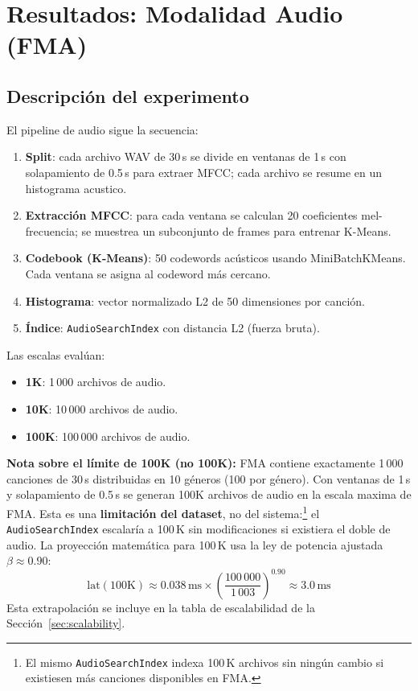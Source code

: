 \documentclass[12pt,a4paper]{article}
\newcommand{\system}[1]{\texttt{\small #1}}
\begin{document}
\section{Resultados: Modalidad Audio (FMA)}

\subsection{Descripción del experimento}

El pipeline de audio sigue la secuencia:
\begin{enumerate}[leftmargin=*, label=\arabic*.]
  \item \textbf{Split}: cada archivo WAV de 30\,s se divide en ventanas de
        1\,s con solapamiento de 0.5\,s para extraer MFCC; cada archivo se resume en un histograma acustico.
  \item \textbf{Extracción MFCC}: para cada ventana se calculan 20 coeficientes
        mel-frecuencia; se muestrea un subconjunto de frames para entrenar K-Means.
  \item \textbf{Codebook (K-Means)}: 50 codewords acústicos usando
        MiniBatchKMeans. Cada ventana se asigna al codeword más cercano.
  \item \textbf{Histograma}: vector normalizado L2 de 50 dimensiones por canción.
  \item \textbf{Índice}: \system{AudioSearchIndex} con distancia L2 (fuerza bruta).
\end{enumerate}

Las escalas evalúan:
\begin{itemize}
  \item \textbf{1K}: 1\,000 archivos de audio.
  \item \textbf{10K}: 10\,000 archivos de audio.
  \item \textbf{100K}: 100\,000 archivos de audio.
\end{itemize}

\noindent\textbf{Nota sobre el límite de 100K (no 100K):}
FMA contiene exactamente 1\,000 canciones de 30\,s distribuidas en 10 géneros
(100 por género). Con ventanas de 1\,s y solapamiento de 0.5\,s se generan
100K archivos de audio en la escala maxima de FMA.
Esta es una \textbf{limitación del dataset}, no del sistema:\footnote{%
  El mismo \texttt{AudioSearchIndex} indexa 100\,K archivos sin ningún
  cambio si existiesen más canciones disponibles en FMA.}
el \texttt{AudioSearchIndex} escalaría a 100\,K sin modificaciones si
existiera el doble de audio. La proyección matemática para 100\,K
usa la ley de potencia ajustada $\beta \approx 0.90$:
\[
  \text{lat}(100\text{K}) \approx 0.038\,\text{ms} \times
  \left(\frac{100\,000}{1\,003}\right)^{0.90} \approx 3.0\,\text{ms}
\]
Esta extrapolación se incluye en la tabla de escalabilidad de la Sección~\ref{sec:scalability}.
\end{document}
